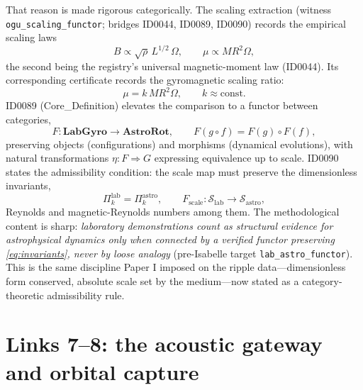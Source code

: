 \documentclass[11pt]{article}
\theoremstyle{remark}
\begin{document}
That reason is made rigorous categorically. The scaling extraction (witness \texttt{ogu\_scaling\_functor}; bridges ID0044, ID0089, ID0090) records the empirical scaling laws
\begin{equation}
B \propto \sqrt{\rho}\, L^{1/2}\, \Omega, \qquad \mu \propto M R^2 \Omega,
\end{equation}
the second being the registry's universal magnetic-moment law (ID0044). Its corresponding certificate records the gyromagnetic scaling ratio:
\begin{equation}
\mu = k\, M R^2 \Omega, \qquad k \approx \mathrm{const}.
\label{eq:moment}
\end{equation}
ID0089 (Core\_Definition) elevates the comparison to a functor between categories,
\begin{equation}
F: \mathbf{LabGyro} \longrightarrow \mathbf{AstroRot}, \qquad F(g \circ f) = F(g) \circ F(f),
\end{equation}
preserving objects (configurations) and morphisms (dynamical evolutions), with natural transformations $\eta: F \Rightarrow G$ expressing equivalence up to scale. ID0090 states the admissibility condition: the scale map must preserve the dimensionless invariants,
\begin{equation}
\Pi_k^{\mathrm{lab}} = \Pi_k^{\mathrm{astro}}, \qquad
F_{\mathrm{scale}}: \mathcal{S}_{\mathrm{lab}} \to \mathcal{S}_{\mathrm{astro}},
\label{eq:invariants}
\end{equation}
Reynolds and magnetic-Reynolds numbers among them. The methodological content is sharp: \emph{laboratory demonstrations count as structural evidence for astrophysical dynamics only when connected by a verified functor preserving \eqref{eq:invariants}, never by loose analogy} (pre-Isabelle target \texttt{lab\_astro\_functor}). This is the same discipline Paper I imposed on the ripple data---dimensionless form conserved, absolute scale set by the medium---now stated as a category-theoretic admissibility rule.

\section{Links 7--8: the acoustic gateway and orbital capture}
\label{sec:gateway}
\end{document}
